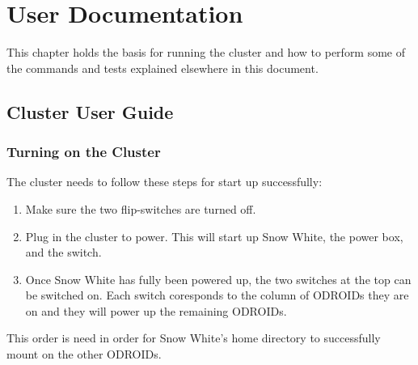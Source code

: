 

\chapter{User Documentation}



This chapter holds the basis for running the cluster and how to perform some of the commands and tests explained elsewhere in this document.

\section{Cluster User Guide}

\subsection{Turning on the Cluster}
The cluster needs to follow these steps for start up successfully:
\begin{enumerate}
	\item Make sure the two flip-switches are turned off.
	\item Plug in the cluster to power. This will start up Snow White, the power box, and the switch.
	\item Once Snow White has fully been powered up, the two switches at the top can be switched on. Each switch coresponds to the column of ODROIDs they are on and they will power up the remaining ODROIDs.
\end{enumerate}
This order is need in order for Snow White's home directory to successfully mount on the other ODROIDs.

